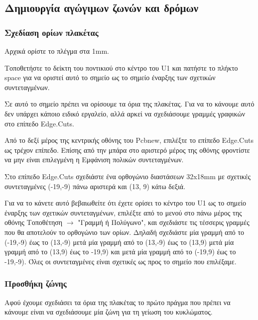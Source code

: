 \documentclass[a4paper]{article}
\begin{document}

\subsection{Δημιουργία αγώγιμων ζωνών και δρόμων}

\subsubsection{Σχεδίαση ορίων πλακέτας}
Αρχικά ορίστε το πλέγμα στα 1mm.

Τοποθετήστε το δείκτη του ποντικιού στο κέντρο του U1 και πατήστε το πλήκτο space για να οριστεί αυτό το σημείο ως το σημείο έναρξης των σχετικών συντεταγμένων.

Σε αυτό το σημείο πρέπει να ορίσουμε τα όρια της πλακέτας. Για να το κάνουμε αυτό δεν υπάρχει κάποιο ειδικό εργαλείο, αλλά αρκεί να σχεδιάσουμε γραμμές γραφικών στο επίπεδο Edge.Cuts.

Από το δεξί μέρος της κεντρικής οθόνης του \textenglish{Pcbnew}, επιλέξτε το επίπεδο Edge.Cuts ως τρέχον επίπεδο. Επίσης από την μπάρα στο αριστερό μέρος της οθόνης φροντίστε να μην είναι επιλεγμένη η Εμφάνιση πολικών συντεταγμένων. %

Στο επίπεδο Edge.Cuts σχεδιάστε ένα ορθογώνιο διαστάσεων 32x18mm με σχετικές συντεταγμένες (-19,-9) πάνω αριστερά και (13, 9) κάτω δεξιά. 

Για να το κάνετε αυτό βεβαιωθείτε ότι έχετε ορίσει το κέντρο του U1  ως το σημείο έναρξης των σχετικών συντεταγμένων, επιλέξτε από το μενού στο πάνω μέρος της οθόνης Τοποθέτηση $\rightarrow$ "Γραμμή ή Πολύγωνο", και σχεδιάστε τις τέσσερις γραμμές που θα αποτελούν το ορθογώνιο των ορίων. Δηλαδή σχεδιάστε μία γραμμή από το (-19,-9) έως το (13,-9) μετά μία γραμμή από το (13,-9) έως το (13,9) μετά μία γραμμή από το (13,9) έως το -19,9) και μετά μία γραμμή από το (-19,9) έως το -19,-9). Όλες οι συντεταγμένες είναι σχετικές ως προς το σημείο που επιλέξαμε.


\subsubsection{Προσθήκη ζώνης}
Αφού έχουμε σχεδιάσει τα όρια της πλακέτας το πρώτο πράγμα που πρέπει να κάνουμε είναι να σχεδιάσουμε μία ζώνη για τη γείωση του κυκλώματος. 
\end{document}
